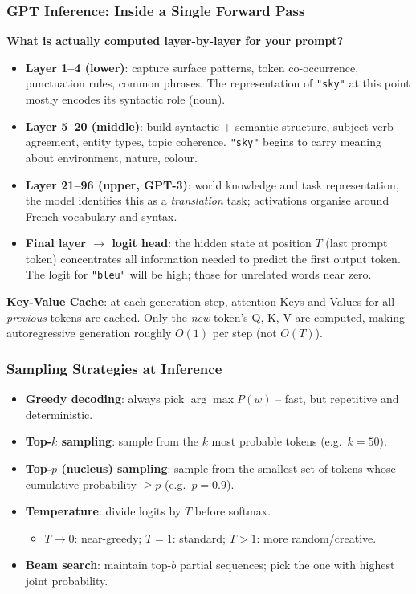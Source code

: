 \begin{frame}[fragile]\frametitle{GPT Inference: Inside a Single Forward Pass}
\textbf{What is actually computed layer-by-layer for your prompt?}
\begin{itemize}
\item \textbf{Layer 1–4 (lower)}: capture surface patterns,  token co-occurrence,
      punctuation rules, common phrases.  The representation of \texttt{"sky"}
      at this point mostly encodes its syntactic role (noun).
\item \textbf{Layer 5–20 (middle)}: build syntactic + semantic structure, 
      subject-verb agreement, entity types, topic coherence.
      \texttt{"sky"} begins to carry meaning about environment, nature, colour.
\item \textbf{Layer 21–96 (upper, GPT-3)}: world knowledge and task representation, 
      the model identifies this as a \emph{translation} task; activations
      organise around French vocabulary and syntax.
\item \textbf{Final layer $\rightarrow$ logit head}: the hidden state at position $T$
      (last prompt token) concentrates all information needed to predict the first
      output token. The logit for \texttt{"bleu"} will be high; those for
      unrelated words near zero.
\end{itemize}
\vspace{0.3em}
\textbf{Key-Value Cache}: at each generation step, attention Keys and Values for
all \emph{previous} tokens are cached. Only the \emph{new} token's Q, K, V are
computed, making autoregressive generation roughly $O(1)$ per step (not $O(T)$).
\end{frame}

\begin{frame}[fragile]\frametitle{Sampling Strategies at Inference}
\begin{itemize}
\item \textbf{Greedy decoding}: always pick $\arg\max P(w)$ – fast, but repetitive and deterministic.
\item \textbf{Top-$k$ sampling}: sample from the $k$ most probable tokens (e.g.\ $k=50$).
\item \textbf{Top-$p$ (nucleus) sampling}: sample from the smallest set of tokens whose cumulative probability $\ge p$ (e.g.\ $p=0.9$).
\item \textbf{Temperature}: divide logits by $T$ before softmax.
  \begin{itemize}
  \item $T \to 0$: near-greedy; $T=1$: standard; $T > 1$: more random/creative.
  \end{itemize}
\item \textbf{Beam search}: maintain top-$b$ partial sequences; pick the one with highest joint probability.
\end{itemize}
\end{frame}

